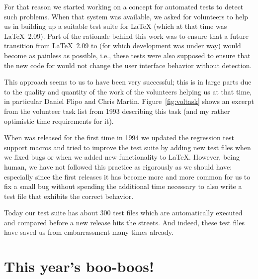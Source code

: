\documentclass{ltugboat}
\begin{document}
For that reason we started working on a concept for automated tests to
detect such problems. When that system was
available,
we asked for volunteers to help us in building up a suitable test suite
for \LaTeX{} (which at that time was \LaTeX~2.09). Part of the rationale
behind this work was to ensure that a future transition from
\LaTeX~2.09 to \LaTeXe{} (for which development was under way) would
become as painless as possible, i.e., these tests were also supposed
to ensure that the new code for \LaTeXe{} would not change the user
interface behavior without detection.

This approach seems to us to have been very successful; this is in
large parts due to the quality and quantity of the work of the
volunteers helping us at that time, in particular Daniel Flipo and
Chris Martin. Figure~\ref{fig:voltask} shows an excerpt from the
volunteer task list from 1993 describing this task (and my rather
optimistic time requirements for it).

When \LaTeXe{} was released for the first time in 1994 we updated the
regression test support macros and tried to improve the test suite by
adding new test files when we fixed bugs or when we added new
functionality to \LaTeX. However, being human, we have not followed
this practice as rigorously as we should have: especially since the
first releases it has become more and more common for us to fix a small
bug without spending the additional time necessary to also write a
test file that exhibits the correct behavior.

Today our test suite has about 300 test files which are automatically
executed and compared before a new release hits the streets. And
indeed, these test files have saved us from embarrassment many times
already.

\section{This year's boo-boos!}
\end{document}
